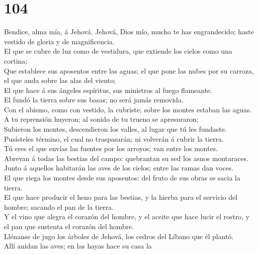 \hypertarget{section-103}{%
\section{104}\label{section-103}}

 Bendice, alma mía, á Jehová. Jehová, Dios mío, mucho te has
engrandecido; haste vestido de gloria y de magnificencia.\\
 El que se cubre de luz como de vestidura, que extiende los
cielos como una cortina;\\
 Que establece sus aposentos entre las aguas; el que pone
las nubes por su carroza, el que anda sobre las alas del viento;\\
 El que hace á sus ángeles espíritus, sus ministros al fuego
flameante.\\
 El fundó la tierra sobre sus basas; no será jamás
removida.\\
 Con el abismo, como con vestido, la cubriste; sobre los
montes estaban las aguas.\\
 A tu reprensión huyeron; al sonido de tu trueno se
apresuraron;\\
 Subieron los montes, descendieron los valles, al lugar que
tú les fundaste.\\
 Pusísteles término, el cual no traspasarán; ni volverán á
cubrir la tierra.\\
 Tú eres el que envías las fuentes por los arroyos; van
entre los montes.\\
 Abrevan á todas las bestias del campo: quebrantan su sed
los asnos montaraces.\\
 Junto á aquellos habitarán las aves de los cielos; entre
las ramas dan voces.\\
 El que riega los montes desde sus aposentos: del fruto de
sus obras se sacia la tierra.\\
 El que hace producir el heno para las bestias, y la hierba
para el servicio del hombre; sacando el pan de la tierra.\\
 Y el vino que alegra el corazón del hombre, y el aceite
que hace lucir el rostro, y el pan que sustenta el corazón del hombre.\\
 Llénanse de jugo los árboles de Jehová, los cedros del
Líbano que él plantó.\\
 Allí anidan las aves; en las hayas hace su casa la
